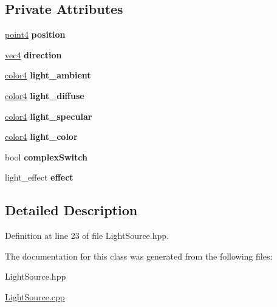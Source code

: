 \subsection*{Private Attributes}
\begin{DoxyCompactItemize}
\item 
\hypertarget{class_light_source_a278ef32fb772d375e03e4c03560502e7}{\hyperlink{struct_angel_1_1vec4}{point4} {\bfseries position}}\label{class_light_source_a278ef32fb772d375e03e4c03560502e7}

\item 
\hypertarget{class_light_source_a104d67d17b33af3a58f2382735afb6c4}{\hyperlink{struct_angel_1_1vec4}{vec4} {\bfseries direction}}\label{class_light_source_a104d67d17b33af3a58f2382735afb6c4}

\item 
\hypertarget{class_light_source_a5cf0b93dace9c126f5e30958c87587c0}{\hyperlink{struct_angel_1_1vec4}{color4} {\bfseries light\-\_\-ambient}}\label{class_light_source_a5cf0b93dace9c126f5e30958c87587c0}

\item 
\hypertarget{class_light_source_a552a553b5040316773e0cb2c054a584c}{\hyperlink{struct_angel_1_1vec4}{color4} {\bfseries light\-\_\-diffuse}}\label{class_light_source_a552a553b5040316773e0cb2c054a584c}

\item 
\hypertarget{class_light_source_a27c63dbb9ebd7d53cff5fc6eb6fba0eb}{\hyperlink{struct_angel_1_1vec4}{color4} {\bfseries light\-\_\-specular}}\label{class_light_source_a27c63dbb9ebd7d53cff5fc6eb6fba0eb}

\item 
\hypertarget{class_light_source_a1e3b92c442e388713988fd255161c9fc}{\hyperlink{struct_angel_1_1vec4}{color4} {\bfseries light\-\_\-color}}\label{class_light_source_a1e3b92c442e388713988fd255161c9fc}

\item 
\hypertarget{class_light_source_a61e14f01d0552850189b3b4678dd5e30}{bool {\bfseries complex\-Switch}}\label{class_light_source_a61e14f01d0552850189b3b4678dd5e30}

\item 
\hypertarget{class_light_source_ac1b02136787eb78d88458d4a92021ba6}{light\-\_\-effect {\bfseries effect}}\label{class_light_source_ac1b02136787eb78d88458d4a92021ba6}

\end{DoxyCompactItemize}


\subsection{Detailed Description}


Definition at line 23 of file Light\-Source.\-hpp.



The documentation for this class was generated from the following files\-:\begin{DoxyCompactItemize}
\item 
Light\-Source.\-hpp\item 
\hyperlink{_light_source_8cpp}{Light\-Source.\-cpp}\end{DoxyCompactItemize}
